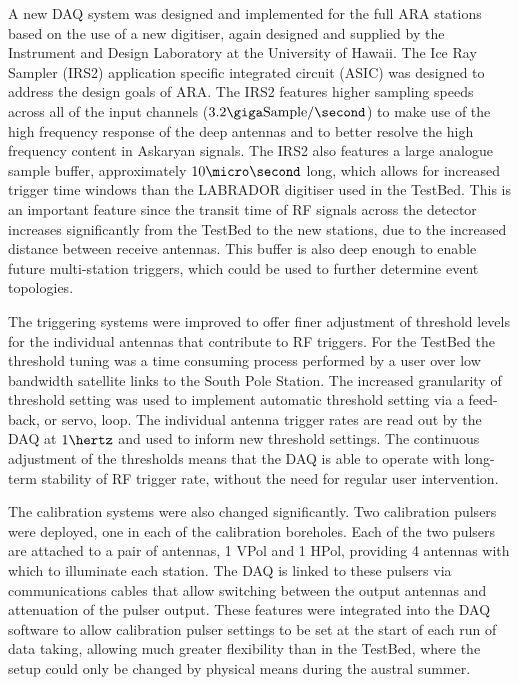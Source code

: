 A new DAQ system was designed and implemented for the full ARA stations based on the use of a new digitiser, again designed and supplied by the Instrument and Design Laboratory at the University of Hawaii. The Ice Ray Sampler (IRS2) application specific integrated circuit (ASIC) was designed to address the design goals of ARA. The IRS2 features higher sampling speeds across all of the input channels ($3.2 \giga \mbox{Sample} /\second$) to make use of the high frequency response of the deep antennas and to better resolve the high frequency content in Askaryan signals. The IRS2 also features a large analogue sample buffer, approximately $10 \micro \second$ long, which allows for increased trigger time windows than the LABRADOR digitiser used in the TestBed. This is an important feature since the transit time of RF signals across the detector increases significantly from the TestBed to the new stations, due to the increased distance between receive antennas. This buffer is also deep enough to enable future multi-station triggers, which could be used to further determine event topologies.

The triggering systems were improved to offer finer adjustment of threshold levels for the individual antennas that contribute to RF triggers. For the TestBed the threshold tuning was a time consuming process performed by a user over low bandwidth satellite links to the South Pole Station. The increased granularity of threshold setting was used to implement automatic threshold setting via a feed-back, or servo, loop. The individual antenna trigger rates are read out by the DAQ at $1 \hertz$ and used to inform new threshold settings. The continuous adjustment of the thresholds means that the DAQ is able to operate with long-term stability of RF trigger rate, without the need for regular user intervention.

The calibration systems were also changed significantly. Two calibration pulsers were deployed, one in each of the calibration boreholes. Each of the two pulsers are attached to a pair of antennas, 1 VPol and 1 HPol, providing 4 antennas with which to illuminate each station. The DAQ is linked to these pulsers via communications cables that allow switching between the output antennas and attenuation of the pulser output. These features were integrated into the DAQ software to allow calibration pulser settings to be set at the start of each run of data taking, allowing much greater flexibility than in the TestBed, where the setup could only be changed by physical means during the austral summer.


